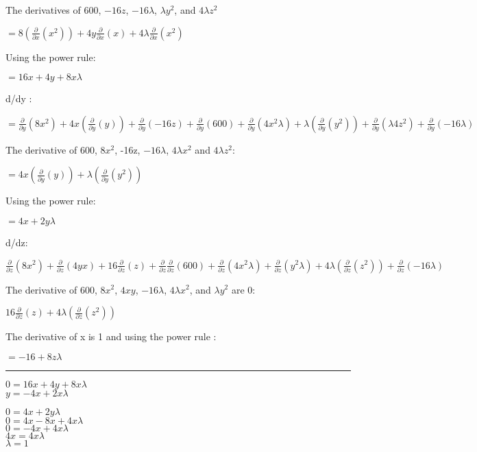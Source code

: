 \documentclass[]{article}
\begin{document}
The derivatives of \(600\), \(-16z\), \(-16 \lambda\), \(\lambda y^2\),
and \(4 \lambda z^2\)

\(= 8 (\frac{\partial}{\partial x}(x^2)) + 4y\frac{\partial}{\partial x}(x) + 4 \lambda \frac{\partial}{\partial x}(x^2)\)

Using the power rule:

\(= 16x + 4y + 8x\lambda\)

d/dy :

\(= \frac{\partial}{\partial y}(8x^2) + 4x(\frac{\partial}{\partial y}(y)) + \frac{\partial}{\partial y}(-16z) + \frac{\partial}{\partial y}(600) + \frac{\partial}{\partial y}(4x^2\lambda) + \lambda ( \frac{\partial}{\partial y} (y^2)) + \frac{\partial}{\partial y}(\lambda4z^2) + \frac{\partial}{\partial y}(-16\lambda)\)

The derivative of 600, \(8x^2\), -16z, \(-16\lambda\), \(4\lambda x^2\)
and \(4 \lambda z^2\):

\(= 4x(\frac{\partial}{\partial y}(y)) + \lambda ( \frac{\partial}{\partial y} (y^2))\)

Using the power rule:

\(= 4x + 2y \lambda\)

d/dz:

\(\frac{\partial}{\partial z} (8x^2) + \frac{\partial}{\partial z}(4yx) + 16\frac{\partial}{\partial z}(z) + \frac{\partial}{\partial z} \frac{\partial}{\partial z} (600) + \frac{\partial}{\partial z} (4x^2 \lambda) + \frac{\partial}{\partial z} (y^2 \lambda) + 4 \lambda (\frac{\partial}{\partial z} (z^2)) + \frac{\partial}{\partial z} (-16 \lambda)\)

The derivative of \(600\), \(8x^2\), \(4xy\), \(-16 \lambda\),
\(4 \lambda x^2\), and \(\lambda y^2\) are 0:

\(16\frac{\partial}{\partial z}(z) + 4 \lambda (\frac{\partial}{\partial z} (z^2))\)

The derivative of x is 1 and using the power rule :

\(= -16 + 8z \lambda\)

\begin{center}\rule{0.5\linewidth}{\linethickness}\end{center}

\(0 = 16x + 4y + 8x\lambda\)\\
\(y = -4x + 2x \lambda\)

\(0 = 4x + 2y \lambda\)\\
\(0 = 4x -8x +4x \lambda\)\\
\(0 = -4x +4x \lambda\)\\
\(4x = 4x \lambda\)\\
\(\lambda = 1\)
\end{document}
